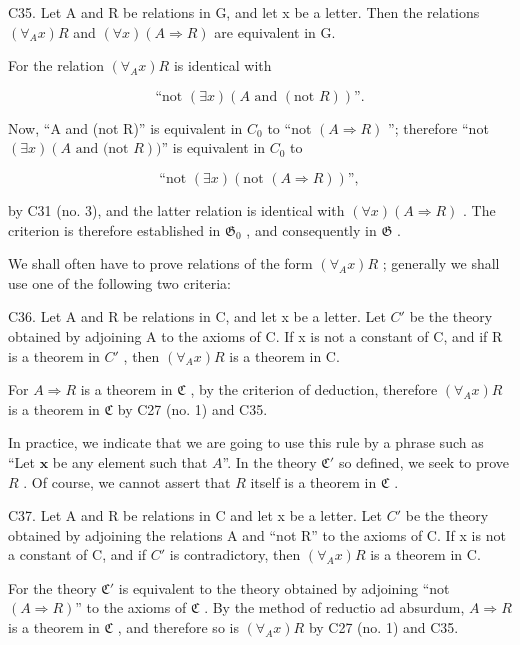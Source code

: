 C35. Let A and R be relations in G, and let x be a letter. Then the relations \((\forall_{A}x)R\) and \((\forall x)(A\Longrightarrow R)\) are equivalent in G.

For the relation \((\forall_{A}x)R\) is identical with

\[
\text{``not } (\exists x) (A \text{ and } (\text{not } R))\text{''}.
\]

Now, ``A and (not R)'' is equivalent in \(C_{0}\) to ``not \((A \Longrightarrow R)\) ''; therefore ``not \((\exists x)(A \text{ and (not } R))\)'' is equivalent in \(C_{0}\) to

\[
\text{``not } (\exists x) (\text{not } (A \Rightarrow R))\text{''},
\]

by C31 (no. 3), and the latter relation is identical with \((\forall x)(A \Rightarrow R)\) . The criterion is therefore established in \(\mathfrak{G}_0\) , and consequently in \(\mathfrak{G}\) .

We shall often have to prove relations of the form \((\forall_{A}x)R\) ; generally we shall use one of the following two criteria:

C36. Let A and R be relations in C, and let x be a letter. Let \(C'\) be the theory obtained by adjoining A to the axioms of C. If x is not a constant of C, and if R is a theorem in \(C'\) , then \((\forall_{A}x)R\) is a theorem in C.

For \(A \Longrightarrow R\) is a theorem in \(\mathfrak{C}\) , by the criterion of deduction, therefore \((\forall_A x) R\) is a theorem in \(\mathfrak{C}\) by C27 (no. 1) and C35.

In practice, we indicate that we are going to use this rule by a phrase such as ``Let \(\pmb{x}\) be any element such that \(A\)''. In the theory \(\mathfrak{C}'\) so defined, we seek to prove \(R\) . Of course, we cannot assert that \(R\) itself is a theorem in \(\mathfrak{C}\) .

C37. Let A and R be relations in C and let x be a letter. Let \(C'\) be the theory obtained by adjoining the relations A and ``not R'' to the axioms of C. If x is not a constant of C, and if \(C'\) is contradictory, then \((\forall_{A}x)R\) is a theorem in C.

For the theory \(\mathfrak{C}'\) is equivalent to the theory obtained by adjoining ``not \((A \Longrightarrow R)\)'' to the axioms of \(\mathfrak{C}\) . By the method of reductio ad absurdum, \(A \Longrightarrow R\) is a theorem in \(\mathfrak{C}\) , and therefore so is \((\forall_A x)R\) by C27 (no. 1) and C35.

